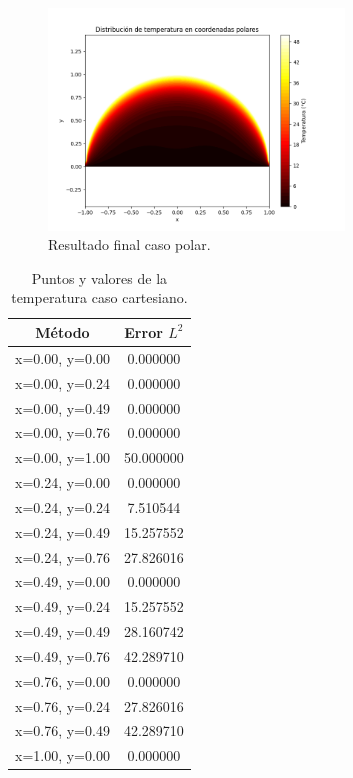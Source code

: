 \begin{figure}[h!]
    \centering
    \includegraphics[width=0.7\textwidth]{figuras/ecuacion_laplace_polar.png}
    \caption{Resultado final caso polar.}
    \label{fig:resultado_polar}
\end{figure}


\begin{table}[h!]
    \centering
    \begin{tabular}{|c|c|}
    \hline
    Método & Error \(L^2\) \\
    \hline
    x=0.00, y=0.00 & 0.000000 \\
    x=0.00, y=0.24 & 0.000000 \\
    x=0.00, y=0.49 & 0.000000 \\
    x=0.00, y=0.76 & 0.000000 \\
    x=0.00, y=1.00 & 50.000000 \\
    x=0.24, y=0.00 & 0.000000 \\
    x=0.24, y=0.24 & 7.510544 \\
    x=0.24, y=0.49 & 15.257552 \\
    x=0.24, y=0.76 & 27.826016 \\
    x=0.49, y=0.00 & 0.000000 \\
    x=0.49, y=0.24 & 15.257552 \\
    x=0.49, y=0.49 & 28.160742 \\
    x=0.49, y=0.76 & 42.289710 \\
    x=0.76, y=0.00 & 0.000000 \\
    x=0.76, y=0.24 & 27.826016 \\
    x=0.76, y=0.49 & 42.289710 \\
    x=1.00, y=0.00 & 0.000000 \\
    \hline
    \end{tabular}
    \caption{Puntos y valores de la temperatura caso cartesiano.}
    \label{tab:caso_cartesiano}
\end{table}

